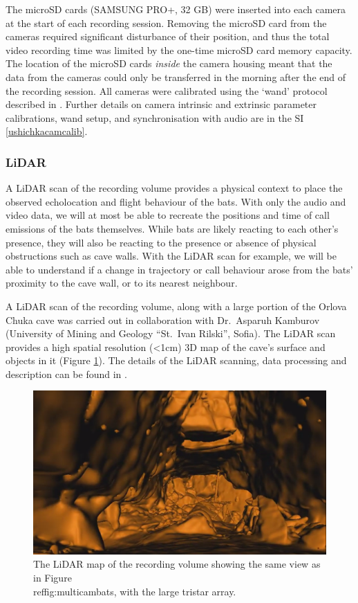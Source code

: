 \documentclass[
]{book}
\begin{document}
The microSD cards (SAMSUNG PRO+, 32 GB) were inserted into each camera at the start of each recording session. Removing the microSD card from the cameras required significant disturbance of their position, and thus the total video recording time was limited by the one-time microSD card memory capacity. The location of the microSD cards \emph{inside} the camera housing meant that the data from the cameras could only be transferred in the morning after the end of the recording session. All cameras were calibrated using the `wand' protocol described in \citet{Theriault2014}. Further details on camera intrinsic and extrinsic parameter calibrations, wand setup, and synchronisation with audio are in the SI \ref{ushichkacamcalib}.

\hypertarget{lidar}{%
\subsubsection{LiDAR}\label{lidar}}

A LiDAR scan of the recording volume provides a physical context to place the observed echolocation and flight behaviour of the bats. With only the audio and video data, we will at most be able to recreate the positions and time of call emissions of the bats themselves. While bats are likely reacting to each other's presence, they will also be reacting to the presence or absence of physical obstructions such as cave walls. With the LiDAR scan for example, we will be able to understand if a change in trajectory or call behaviour arose from the bats' proximity to the cave wall, or to its nearest neighbour.

A LiDAR scan of the recording volume, along with a large portion of the Orlova Chuka cave was carried out in collaboration with Dr.~Asparuh Kamburov (University of Mining and Geology ``St.~Ivan Rilski'', Sofia). The LiDAR scan provides a high spatial resolution (\textless1cm) 3D map of the cave's surface and objects in it (Figure \ref{fig:lidarimage}). The details of the LiDAR scanning, data processing and description can be found in \citet{bggeospatial}.

\begin{figure}
\includegraphics[width=1\linewidth]{original_papers/ushichka-figures/lidar_image} \caption{The LiDAR map of the recording volume showing the same view as in Figure \\ref{fig:multicambats}, with the large tristar array.}\label{fig:lidarimage}
\end{figure}
\end{document}
